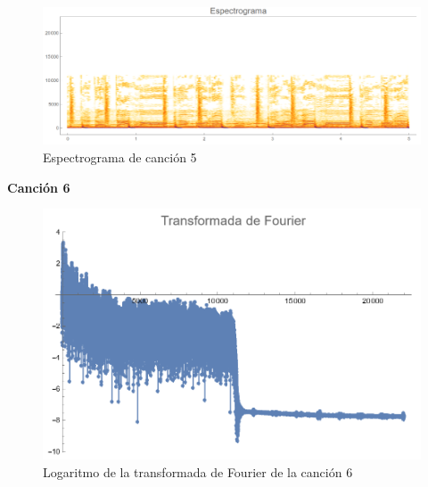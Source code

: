 \documentclass[12pt, letterpaper]{article}
\begin{document}
\begin{figure}[H]
  \centering
  \includegraphics[width=.9\linewidth]{imgs/Cancion5/espectrograma.png}
  \caption{Espectrograma de canción 5}
  \label{fig:05i}
\end{figure}

\textbf{\large{Canción 6}}
\begin{figure}[H]
  \centering
  \includegraphics[width=0.7\linewidth]{imgs/Cancion6/transformada.png}
  \caption{Logaritmo de la transformada de Fourier de la canción 6}
  \label{fig:06a}
\end{figure}
\end{document}
